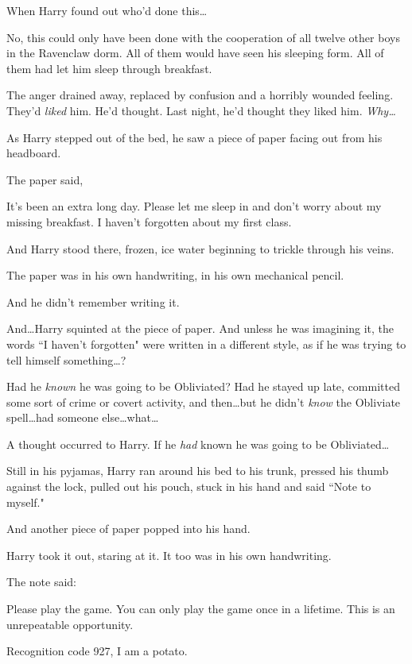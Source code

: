 When Harry found out who'd done this…

No, this could only have been done with the cooperation of all twelve other boys in the Ravenclaw dorm. All of them would have seen his sleeping form. All of them had let him sleep through breakfast.

The anger drained away, replaced by confusion and a horribly wounded feeling. They'd \emph{liked} him. He'd thought. Last night, he'd thought they liked him. \emph{Why…}

As Harry stepped out of the bed, he saw a piece of paper facing out from his headboard.

The paper said,

\begin{writtenNote}

It's been an extra long day. Please let me sleep in and don't worry about my missing breakfast. I haven't forgotten about my first class.

\end{writtenNote}

And Harry stood there, frozen, ice water beginning to trickle through his veins.

The paper was in his own handwriting, in his own mechanical pencil.

And he didn't remember writing it.

And…Harry squinted at the piece of paper. And unless he was imagining it, the words ``I haven't forgotten" were written in a different style, as if he was trying to tell himself something…?

Had he \emph{known} he was going to be Obliviated? Had he stayed up late, committed some sort of crime or covert activity, and then…but he didn't \emph{know} the Obliviate spell…had someone else…what…

A thought occurred to Harry. If he \emph{had} known he was going to be Obliviated…

Still in his pyjamas, Harry ran around his bed to his trunk, pressed his thumb against the lock, pulled out his pouch, stuck in his hand and said ``Note to myself."

And another piece of paper popped into his hand.

Harry took it out, staring at it. It too was in his own handwriting.

The note said:

\begin{writtenNote}

Please play the game. You can only play the game once in a lifetime. This is an unrepeatable opportunity.

Recognition code 927, I am a potato.

\end{writtenNote}

